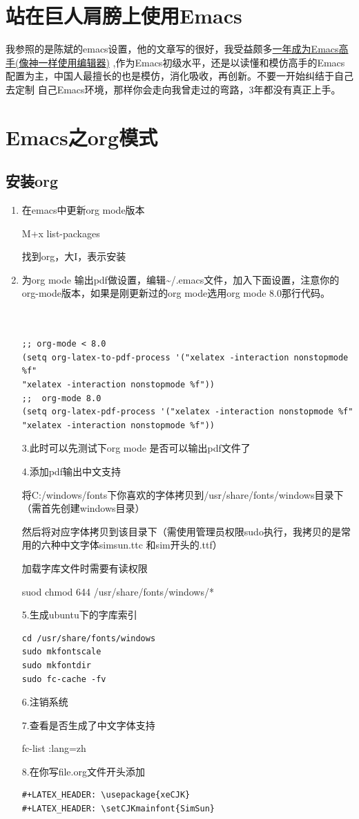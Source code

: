 \documentclass[11pt]{article}
\begin{document}
\section{站在巨人肩膀上使用Emacs}
\label{sec-5}

  我参照的是陈斌的emacs设置，他的文章写的很好，我受益颇多\href{http://blog.csdn.net/redguardtoo/article/details/7222501}{一年成为Emacs高手(像神一样使用编辑器)}
  ,作为Emacs初级水平，还是以读懂和模仿高手的Emacs配置为主，中国人最擅长的也是模仿，消化吸收，再创新。不要一开始纠结于自己去定制
  自己Emacs环境，那样你会走向我曾走过的弯路，3年都没有真正上手。
\section{Emacs之org模式}
\label{sec-6}
\subsection{安装org}
\label{sec-6-1}

\begin{enumerate}
\item 在emacs中更新org mode版本

   M+x list-packages

   找到org，大I，表示安装
\item 为org mode 输出pdf做设置，编辑\~{}/.emacs文件，加入下面设置，注意你的org-mode版本，如果是刚更新过的org mode选用org mode 8.0那行代码。

\begin{verbatim}


;; org-mode < 8.0
(setq org-latex-to-pdf-process '("xelatex -interaction nonstopmode %f"
"xelatex -interaction nonstopmode %f"))
;;  org-mode 8.0
(setq org-latex-pdf-process '("xelatex -interaction nonstopmode %f"
"xelatex -interaction nonstopmode %f"))
\end{verbatim}

   3.此时可以先测试下org mode 是否可以输出pdf文件了

   4.添加pdf输出中文支持

   将C:/windows/fonts下你喜欢的字体拷贝到/usr/share/fonts/windows目录下（需首先创建windows目录）

   然后将对应字体拷贝到该目录下（需使用管理员权限sudo执行，我拷贝的是常用的六种中文字体simsun.ttc 和sim开头的.ttf） 

   加载字库文件时需要有读权限

   suod chmod 644 /usr/share/fonts/windows/*

   5.生成ubuntu下的字库索引

\begin{verbatim}
cd /usr/share/fonts/windows
sudo mkfontscale  
sudo mkfontdir  
sudo fc-cache -fv
\end{verbatim}

   6.注销系统

   7.查看是否生成了中文字体支持

   fc-list :lang=zh

   8.在你写file.org文件开头添加


\begin{verbatim}
#+LATEX_HEADER: \usepackage{xeCJK}
#+LATEX_HEADER: \setCJKmainfont{SimSun}
\end{verbatim}
\end{enumerate}
\end{document}
